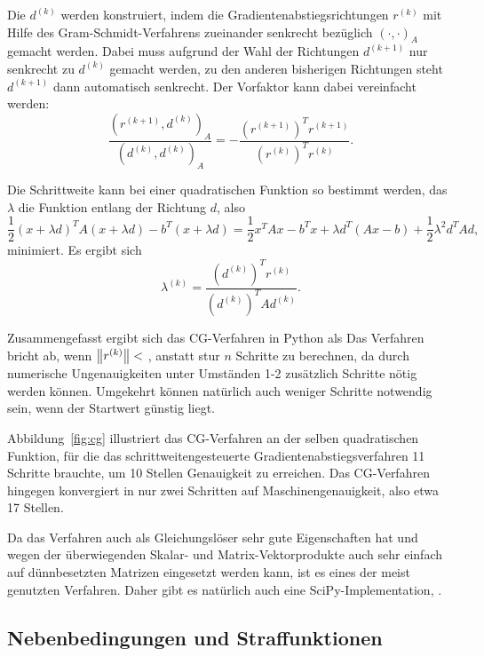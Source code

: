 Die $d^{(k)}$ werden konstruiert, indem die
Gradientenabstiegsrichtungen $r^{(k)}$ mit Hilfe des
Gram-Schmidt-Verfahrens zueinander senkrecht bezüglich
$(\cdot,\cdot)_A$ gemacht werden. Dabei muss aufgrund der Wahl der
Richtungen $d^{(k+1)}$ nur senkrecht zu $d^{(k)}$ gemacht werden, zu
den anderen bisherigen Richtungen steht $d^{(k+1)}$ dann automatisch
senkrecht. Der Vorfaktor kann dabei vereinfacht werden:
\begin{equation}
  \frac{(r^{(k+1)}, d^{(k)})_A}{(d^{(k)}, d^{(k)})_A}
  = -\frac{\left(r^{(k+1)}\right)^Tr^{(k+1)}}{\left(r^{(k)}\right)^Tr^{(k)}}.
\end{equation}

Die Schrittweite kann bei einer quadratischen Funktion so bestimmt
werden, das $\lambda$ die Funktion entlang der Richtung $d$, also
\begin{equation}
  \frac{1}{2}(x+\lambda d)^TA(x+\lambda d) - b^T(x+\lambda d)
  =  \frac{1}{2}x^TAx - b^Tx + \lambda d^T(Ax - b) + \frac{1}{2}\lambda^2 d^TAd,
\end{equation}
minimiert. Es ergibt sich
\begin{equation}
  \lambda^{(k)}  =  \frac{\left(d^{(k)}\right)^Tr^{(k)}}{\left(d^{(k)}\right)^TAd^{(k)}}.
\end{equation}

Zusammengefasst ergibt sich das CG-Verfahren in Python als
%
Das Verfahren bricht ab, wenn $\left\lVert{r^{(k)}}\right\rVert <$ , anstatt
stur $n$ Schritte zu berechnen, da durch numerische Ungenauigkeiten
unter Umständen 1-2 zusätzlich Schritte nötig werden können. Umgekehrt
können natürlich auch weniger Schritte notwendig sein, wenn der
Startwert günstig liegt.

Abbildung~\ref{fig:cg} illustriert das CG-Verfahren an der selben
quadratischen Funktion, für die das schrittweitengesteuerte
Gradientenabstiegsverfahren 11 Schritte brauchte, um 10 Stellen
Genauigkeit zu erreichen. Das CG-Verfahren hingegen konvergiert in nur
zwei Schritten auf Maschinengenauigkeit, also etwa 17 Stellen.

Da das Verfahren auch als Gleichungslöser sehr gute Eigenschaften hat
und wegen der überwiegenden Skalar- und Matrix-Vektorprodukte auch
sehr einfach auf dünnbesetzten Matrizen eingesetzt werden kann, ist es
eines der meist genutzten Verfahren. Daher gibt es natürlich auch eine
SciPy-Implementation, .

\subsection{Nebenbedingungen und Straffunktionen}


